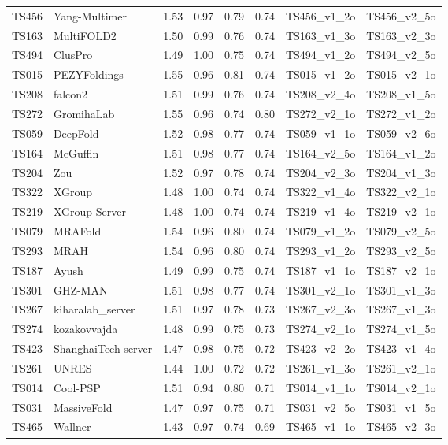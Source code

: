\begin{longtable}{llllllll}
TS456 & Yang-Multimer & 1.53 & 0.97 & 0.79 & 0.74 & TS456\_v1\_2o & TS456\_v2\_5o \\ 
TS163 & MultiFOLD2 & 1.50 & 0.99 & 0.76 & 0.74 & TS163\_v1\_3o & TS163\_v2\_3o \\ 
TS494 & ClusPro & 1.49 & 1.00 & 0.75 & 0.74 & TS494\_v1\_2o & TS494\_v2\_5o \\ 
TS015 & PEZYFoldings & 1.55 & 0.96 & 0.81 & 0.74 & TS015\_v1\_2o & TS015\_v2\_1o \\ 
TS208 & falcon2 & 1.51 & 0.99 & 0.76 & 0.74 & TS208\_v2\_4o & TS208\_v1\_5o \\ 
TS272 & GromihaLab & 1.55 & 0.96 & 0.74 & 0.80 & TS272\_v2\_1o & TS272\_v1\_2o \\ 
TS059 & DeepFold & 1.52 & 0.98 & 0.77 & 0.74 & TS059\_v1\_1o & TS059\_v2\_6o \\ 
TS164 & McGuffin & 1.51 & 0.98 & 0.77 & 0.74 & TS164\_v2\_5o & TS164\_v1\_2o \\ 
TS204 & Zou & 1.52 & 0.97 & 0.78 & 0.74 & TS204\_v2\_3o & TS204\_v1\_3o \\ 
TS322 & XGroup & 1.48 & 1.00 & 0.74 & 0.74 & TS322\_v1\_4o & TS322\_v2\_1o \\ 
TS219 & XGroup-Server & 1.48 & 1.00 & 0.74 & 0.74 & TS219\_v1\_4o & TS219\_v2\_1o \\ 
TS079 & MRAFold & 1.54 & 0.96 & 0.80 & 0.74 & TS079\_v1\_2o & TS079\_v2\_5o \\ 
TS293 & MRAH & 1.54 & 0.96 & 0.80 & 0.74 & TS293\_v1\_2o & TS293\_v2\_5o \\ 
TS187 & Ayush & 1.49 & 0.99 & 0.75 & 0.74 & TS187\_v1\_1o & TS187\_v2\_1o \\ 
TS301 & GHZ-MAN & 1.51 & 0.98 & 0.77 & 0.74 & TS301\_v2\_1o & TS301\_v1\_3o \\ 
TS267 & kiharalab\_server & 1.51 & 0.97 & 0.78 & 0.73 & TS267\_v2\_3o & TS267\_v1\_3o \\ 
TS274 & kozakovvajda & 1.48 & 0.99 & 0.75 & 0.73 & TS274\_v2\_1o & TS274\_v1\_5o \\ 
TS423 & ShanghaiTech-server & 1.47 & 0.98 & 0.75 & 0.72 & TS423\_v2\_2o & TS423\_v1\_4o \\ 
TS261 & UNRES & 1.44 & 1.00 & 0.72 & 0.72 & TS261\_v1\_3o & TS261\_v2\_1o \\ 
TS014 & Cool-PSP & 1.51 & 0.94 & 0.80 & 0.71 & TS014\_v1\_1o & TS014\_v2\_1o \\ 
TS031 & MassiveFold & 1.47 & 0.97 & 0.75 & 0.71 & TS031\_v2\_5o & TS031\_v1\_5o \\ 
TS465 & Wallner & 1.43 & 0.97 & 0.74 & 0.69 & TS465\_v1\_1o & TS465\_v2\_3o \\ 

\end{longtable}
